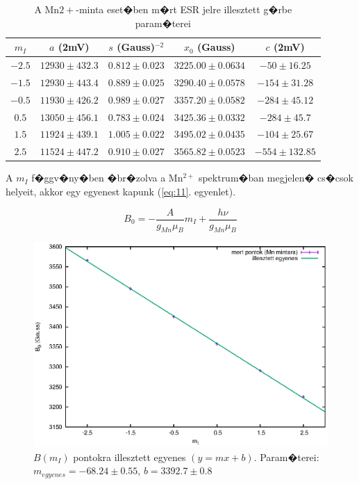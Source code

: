 \documentclass[a4paper,12pt]{article}
\begin{document}
\begin{table}
\begin{center}
\begin{tabular}{|c|c|c|c|c|}
 \hline
$m_I$ & $a$ (2mV) & $s$ (Gauss)$^{-2}$ & $x_0$ (Gauss) & $c$ (2mV) \\ \hline
$-2.5$ & $12930 \pm 432.3$ & $0.812 \pm 0.023$ & $3225.00 \pm 0.0634$ & $-50 \pm 16.25$ \\ \hline
$-1.5$ & $12930 \pm 443.4$ & $0.889 \pm 0.025$ & $3290.40 \pm 0.0578$ & $-154\pm 31.28$ \\ \hline
$-0.5$ & $11930 \pm 426.2$ & $0.989 \pm 0.027$ & $3357.20 \pm 0.0582$ & $-284\pm 45.12$ \\ \hline
$0.5$  & $13050 \pm 456.1$ & $0.783 \pm 0.024$ & $3425.36 \pm 0.0332$ & $-284\pm 45.7$ \\ \hline
$1.5$  & $11924 \pm 439.1$ & $1.005 \pm 0.022$ & $3495.02 \pm 0.0435$ & $-104\pm 25.67$ \\ \hline
$2.5$  & $11524 \pm 447.2$ & $0.910 \pm 0.027$ & $3565.82 \pm 0.0523$ & $-554\pm 132.85$ \\ \hline
\end{tabular}
\caption{A Mn${2+}$-minta eset�ben m�rt ESR jelre illesztett g�rbe param�terei}
\label{tab:2}
\end{center}
\end{table}

A $m_I$ f�ggv�ny�ben �br�zolva a Mn$^{2+}$ spektrum�ban megjelen� cs�csok helyeit, akkor egy egyenest kapunk (\ref{eq:11}. egyenlet).

\begin{equation}
B_0 = - \frac{A}{g_{Mn} \mu_B}  m_I + \dfrac{h \nu}{g_{Mn} \mu_B}
\label{eq:11}
\end{equation}

\begin{figure}[H]
\includegraphics[width=15cm]{Mn.eps}
\centering
\caption{$B(m_I)$ pontokra illesztett egyenes $(y=mx+b)$. Param�terei: $m_{egyenes}=-68.24\pm0.55$, $b=3392.7\pm0.8$ }
\label{fig:3}
\end{figure}
\end{document}
